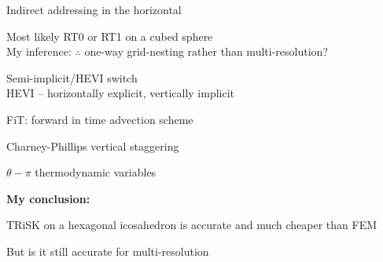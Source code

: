 \begin{slide}


\begin{list0}
\item Indirect addressing in the horizontal \pauseHS
\item Most likely RT0 or RT1 on a cubed sphere\\
My inference: $\therefore$ one-way grid-nesting rather than multi-resolution?\pauseHS
\item Semi-implicit/HEVI switch\\
    HEVI -- horizontally explicit, vertically implicit\pauseHS
\item FiT: forward in time advection scheme\pauseHS
\item Charney-Phillips vertical staggering\pauseHS
\item $\theta-\pi$ thermodynamic variables
\end{list0}

\vspace{2cm}
{\bf\large My conclusion:\pauseHS}
\begin{list0}
\item TRiSK on a hexagonal icosahedron is accurate and much cheaper than FEM
\item But is it still accurate for multi-resolution
\end{list0}

\end{slide}
